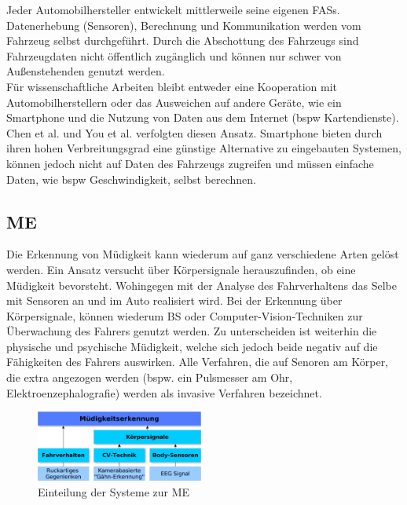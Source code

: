 {Jeder Automobilhersteller entwickelt mittlerweile seine eigenen \acl{FASs}. Datenerhebung (Sensoren), Berechnung und Kommunikation werden vom Fahrzeug selbst durchgeführt. Durch die Abschottung des Fahrzeugs sind Fahrzeugdaten nicht öffentlich zugänglich und können nur schwer von Außenstehenden genutzt werden. \\

Für wissenschaftliche Arbeiten bleibt entweder eine Kooperation mit Automobilherstellern oder das Ausweichen auf andere Geräte, wie ein Smartphone und die Nutzung von Daten aus dem Internet (\acl{bspw} Kartendienste). Chen et al. \cite{Chen:2015:ISV:2742647.2742659} und You et al. \cite{You:2013:CAA:2462456.2465428} verfolgten diesen Ansatz. Smartphone bieten durch ihren hohen Verbreitungsgrad eine günstige Alternative zu eingebauten Systemen, können jedoch nicht auf Daten des Fahrzeugs zugreifen und müssen einfache Daten, wie \acl{bspw} Geschwindigkeit, selbst berechnen.

\subsection{\acl{ME}}
Die Erkennung von Müdigkeit kann wiederum auf ganz verschiedene Arten gelöst werden. Ein Ansatz versucht über Körpersignale herauszufinden, ob eine Müdigkeit bevorsteht. Wohingegen mit der Analyse des Fahrverhaltens das Selbe mit Sensoren an und im Auto realisiert wird.
Bei der Erkennung über Körpersignale, können wiederum \acl{BS} oder Computer-Vision-Techniken zur Überwachung des Fahrers genutzt werden. Zu unterscheiden ist weiterhin die physische und psychische Müdigkeit, welche sich jedoch beide negativ auf die Fähigkeiten des Fahrers auswirken. Alle Verfahren, die auf Senoren am Körper, die extra angezogen werden (bspw. ein Pulsmesser am Ohr, Elektroenzephalografie) werden als invasive Verfahren bezeichnet. 

\begin{figure}[h] 
  \begin{center}
    \includegraphics[width=5.5cm]{img/ddd}
    \caption{Einteilung der Systeme zur \acl{ME}}
    \label{fig:block}
  \end{center}
\end{figure}

}
